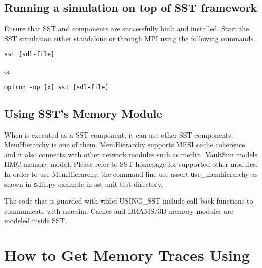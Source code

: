 \subsection{Running a \SIM simulation on top of SST framework}

Ensure that SST and \SIM components are successfully built and installed.  
Start the SST simulation either standalone or through MPI using the following commands.

\begin{Verbatim}
sst [sdl-file]
\end{Verbatim}
or
\begin{Verbatim}
mpirun -np [x] sst [sdl-file]
\end{Verbatim}


\subsection{Using  SST's Memory Module}

When \SIM is executed as a SST component, it can use other SST
components. MemHierarchy  is one of them.  MemHierarchy supports MESI
cache coherence and it also connects with other network modules such
as merlin. VaultSim models HMC memory model.  Please refer to SST homepage for supported other modules. 
In order to use MemHierarchy,  the command line use assert {\texttt use\_memhierarchy} as shown in {\texttt sdl1.py} example in sst-unit-test
directory.  

The code that is guarded with  {\texttt \#ifdef USING\_SST}  include call
back functions to communicate with macsim.  Caches and DRAMS/3D memory
modules are modeled inside SST. 

\ignore
	  {
	  \section{How to Get Memory Traces Using \SIM}

	  }









